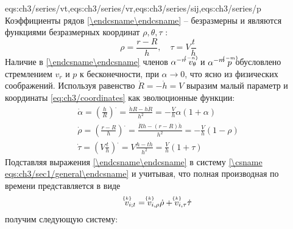\expandafter\gdef\csname eqs:ch3/series\endcsname{eqs:ch3/series/vt,eqs:ch3/series/vr,eqs:ch3/series/sij,eqs:ch3/series/p}
Коэффициенты рядов \cref{\csname eqs:ch3/series\endcsname} -- безразмерны и являются функциями безразмерных координат $\rho, \theta, \tau$ :
\begin{equation}
  \label{eq:ch3/coordinates}
  \rho = \frac{r-R}{h}, \quad \tau = V \frac{t}{h}
\end{equation}
Наличие в \cref{\csname eqs:ch3/series\endcsname} членов $\alpha^{-n} \; \uindex{v}{-n}_{\theta}$ и $\alpha^{-m} \; \uindex{p}{-m}$ обусловлено стремлением $v_{r}$ и $p$ к бесконечности, при $\alpha\rightarrow 0$, что ясно из физических соображений.
Используя равенство $\dot{R}=-\dot{h}= V$ выразим малый параметр и координаты \cref{eq:ch3/coordinates} как эволюционные функции:
\begin{gather}
  \dot{\alpha} = \left(\frac{h}{R}\right)^. = \frac{\dot{h}R - h\dot{R}}{h^2} = -\frac{V}{h} \alpha \left(1+\alpha\right)
  \\
  \dot{\rho} = \left(\frac{r-R}{h}\right)^. = \frac{\dot{R} h - \left(r-R\right) \dot{h}}{h^2} = -\frac{V}{h}\left(1-\rho\right)
  \\
  \dot{\tau} = \left(V \frac{t}{h}\right)^. = V \frac{h - t\dot{h}}{h^2} = \frac{V}{h} \left(1+\tau\right)
\end{gather}
Подставляя выражения \cref{\csname eqs:ch3/series\endcsname} в систему \cref{\csname eqs:ch3/sec1/general\endcsname} и учитывая, что полная производная по времени представляется в виде
\begin{equation*}
  \uindex{v}{k}_{i;t} = \uindex{v}{k}_{i,\rho} \dot{\rho} + \uindex{v}{k}_{i,\tau} \dot{\tau}
\end{equation*}
получим следующую систему:
\begingroup
\allowdisplaybreaks
